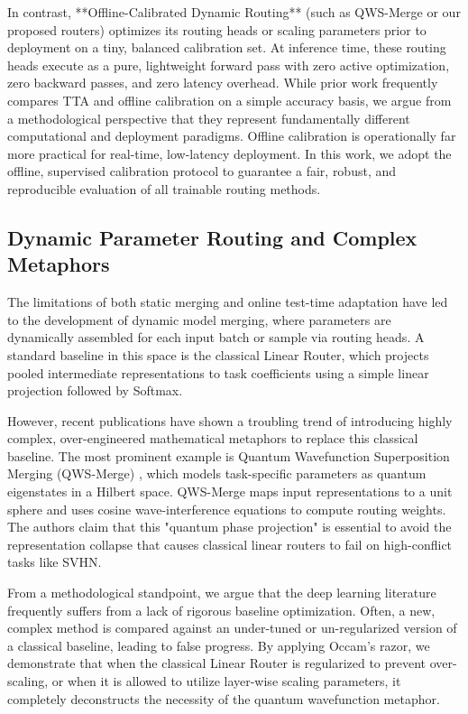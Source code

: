 In contrast, **Offline-Calibrated Dynamic Routing** (such as QWS-Merge or our proposed routers) optimizes its routing heads or scaling parameters prior to deployment on a tiny, balanced calibration set. At inference time, these routing heads execute as a pure, lightweight forward pass with zero active optimization, zero backward passes, and zero latency overhead. 
While prior work frequently compares TTA and offline calibration on a simple accuracy basis, we argue from a methodological perspective that they represent fundamentally different computational and deployment paradigms. Offline calibration is operationally far more practical for real-time, low-latency deployment. In this work, we adopt the offline, supervised calibration protocol to guarantee a fair, robust, and reproducible evaluation of all trainable routing methods.

\subsection{Dynamic Parameter Routing and Complex Metaphors}
The limitations of both static merging and online test-time adaptation have led to the development of dynamic model merging, where parameters are dynamically assembled for each input batch or sample via routing heads. A standard baseline in this space is the classical Linear Router, which projects pooled intermediate representations to task coefficients using a simple linear projection followed by Softmax.

However, recent publications have shown a troubling trend of introducing highly complex, over-engineered mathematical metaphors to replace this classical baseline. The most prominent example is Quantum Wavefunction Superposition Merging (QWS-Merge) \cite{qws_merge}, which models task-specific parameters as quantum eigenstates in a Hilbert space. QWS-Merge maps input representations to a unit sphere and uses cosine wave-interference equations to compute routing weights. The authors claim that this "quantum phase projection" is essential to avoid the representation collapse that causes classical linear routers to fail on high-conflict tasks like SVHN.

From a methodological standpoint, we argue that the deep learning literature frequently suffers from a lack of rigorous baseline optimization. Often, a new, complex method is compared against an under-tuned or un-regularized version of a classical baseline, leading to false progress. By applying Occam's razor, we demonstrate that when the classical Linear Router is regularized to prevent over-scaling, or when it is allowed to utilize layer-wise scaling parameters, it completely deconstructs the necessity of the quantum wavefunction metaphor.
